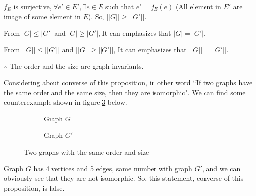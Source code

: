 \documentclass[12pt, letterpaper]{article}
\begin{document}
$f_E$ is surjective, $\forall e' \in E', \exists e \in E$ such that $e' = f_E(e)$ (All element in $E'$ are image of some element in $E$). So, $\vert\vert G \vert\vert \geq \vert\vert G' \vert\vert$.

From $\vert G \vert \leq \vert G' \vert$ and $\vert G \vert \geq \vert G' \vert$, It can emphasizes that $\vert G \vert = \vert G' \vert$.

From $\vert\vert G \vert\vert \leq \vert\vert G' \vert\vert$ and $\vert\vert G \vert\vert \geq \vert\vert G' \vert\vert$, It can emphasizes that $\vert\vert G \vert\vert = \vert\vert G' \vert\vert$.

$\therefore$ The order and the size are graph invariants.

Considering about converse of this proposition, in other word “If two graphs have the same order and the same size, then they are isomorphic". We can find some counterexample shown in figure \ref{fig:entire_fig} below.

\begin{figure}[H]
\begin{subfigure}{0.4\textwidth}
    \centering
    \caption{Graph $G$}
    \label{fig:subfig_a}
\end{subfigure}
\hfill
\begin{subfigure}{0.4\textwidth}
    \centering
    \caption{Graph $G'$}
    \label{fig:subfig_b}
\end{subfigure}
\caption{Two graphs with the same order and size}
\label{fig:entire_fig}
\end{figure}

Graph $G$ has 4 vertices and 5 edges, same number with graph $G'$, and we can obviously see that they are not isomorphic. So, this statement, converse of this proposition, is false.
\end{document}
